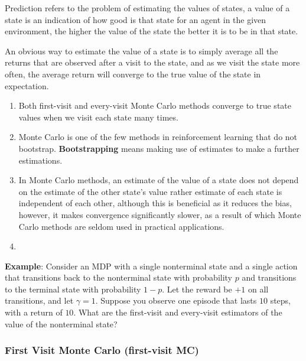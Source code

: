 Prediction refers to the problem of estimating the values of states, a value of a state is an indication of how good is that state for an agent in the given environment, the higher the value of the state the better it is to be in that state.

An obvious way to estimate the value of a state is to simply average all the returns that are observed after a visit to the state, and as we visit the state more often, the average return will converge to the true value of the state in expectation.

\begin{enumerate}
    \item Both first-visit and every-visit Monte Carlo methods converge to true state values when we visit each state many times.

    \item Monte Carlo is one of the few methods in reinforcement learning that do not bootstrap. \textbf{Bootstrapping}\label{RL: Bootstrapping} means making use of estimates to make a further estimations.

    \item In Monte Carlo methods, an estimate of the value of a state does not depend on the estimate of the other state's value rather estimate of each state is independent of each other, although this is beneficial as it reduces the bias, however, it makes convergence significantly slower, as a result of which Monte Carlo methods are seldom used in practical applications.

    \item 

\end{enumerate} 

\vspace{0.2cm}
\textbf{Example}: Consider an MDP with a single nonterminal state and a single action that transitions back to the nonterminal state with probability $p$ and transitions to the terminal state with probability $1-p$. Let the reward be $+1$ on all transitions, and let $\gamma=1$. Suppose you observe one episode that lasts $10$ steps, with a return of $10$. What are the first-visit and every-visit estimators of the value of the nonterminal state?

\subsubsection{First Visit Monte Carlo (first-visit MC) \cite{medium/nerd-for-tech/monte-carlo-methods-for-reinforcement-learning-d30d874dd817}}

